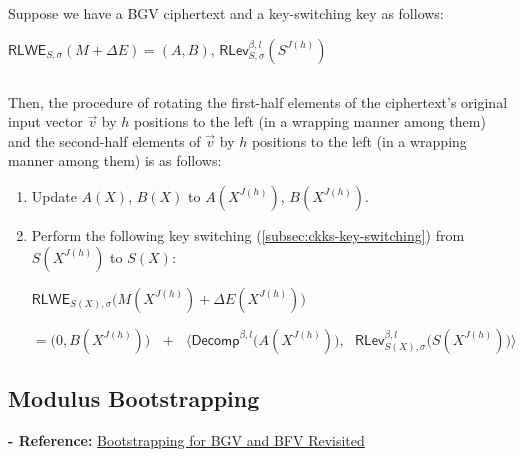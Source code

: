 \begin{tcolorbox}[title={\textbf{\tboxlabel{\ref*{subsec:bgv-rotation}} BGV's Homomorphic Rotation of Input Vector Slots}}]


Suppose we have a BGV ciphertext and a key-switching key as follows:

$\textsf{RLWE}_{S, \sigma}(M + \Delta E) = (A, B)$, \text{ } $\textsf{RLev}_{S, \sigma}^{\beta, l}(S^{J(h)})$

$ $

Then, the procedure of rotating the first-half elements of the ciphertext's original input vector $\vec{v}$ by $h$ positions to the left (in a wrapping manner among them) and the second-half elements of $\vec{v}$ by $h$ positions to the left (in a wrapping manner among them) is as follows: 

\begin{enumerate}
\item Update $A(X)$, $B(X)$ to $A(X^{J(h)})$, $B(X^{J(h)})$. 
\item Perform the following key switching (\autoref{subsec:ckks-key-switching}) from $S(X^{J(h)})$ to $S(X)$:

$\textsf{RLWE}_{S(X),\sigma}\bm{(} M(X^{J(h)}) + \Delta E(X^{J(h)})\bm{)} $

$= \bm{(} 0, B(X^{J(h)}) \bm{)} \text{ } + \text{ } \bm{\langle}  \textsf{Decomp}^{\beta, l}\bm{(}A(X^{J(h)})\bm{)}, \text{ } \textsf{RLev}_{S(X), \sigma}^{\beta, l}\bm{(}S(X^{J(h)})\bm{)} \bm{\rangle}$
\end{enumerate}


\end{tcolorbox}




\subsection{Modulus Bootstrapping}
\label{subsec:bgv-bootstrapping}

\noindent \textbf{- Reference:} 
\href{https://eprint.iacr.org/2022/1363.pdf}{Bootstrapping for BGV and BFV Revisited}


